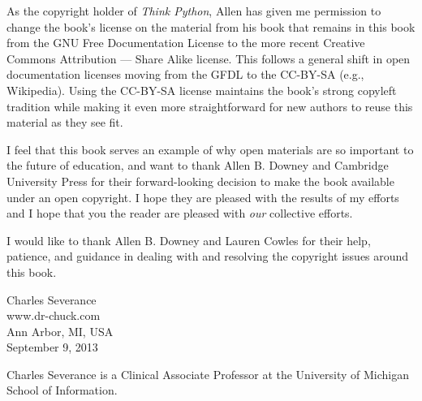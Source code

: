 As the copyright holder of \emph{Think Python},
Allen has given me permission to change the book's license 
on the material from his book that remains in this book
from the
GNU Free Documentation License 
to the more recent
Creative Commons Attribution --- Share Alike
license.
This follows a general shift in open documentation licenses moving 
from the GFDL to the CC-BY-SA (e.g., Wikipedia).
Using the CC-BY-SA license maintains the book's 
strong copyleft tradition while making it even more straightforward 
for new authors to reuse this material as they see fit.

I feel that this book serves an example of why open 
materials are so important to the future of education,
and want to thank Allen B. Downey and Cambridge University
Press for their forward-looking decision to make the book available
under an open copyright.   I hope they are pleased with the 
results of my efforts and I hope that you the reader are pleased with
\emph{our} collective efforts.

I would like to thank Allen B. Downey and Lauren Cowles for their help,
patience, and guidance in dealing with and resolving the copyright 
issues around this book.

Charles Severance\\
www.dr-chuck.com\\
Ann Arbor, MI, USA\\
September 9, 2013

Charles Severance is a 
Clinical Associate Professor 
at the University of Michigan School of Information.

\clearemptydoublepage

\begin{latexonly}

\tableofcontents

\clearemptydoublepage

\end{latexonly}

\mainmatter

